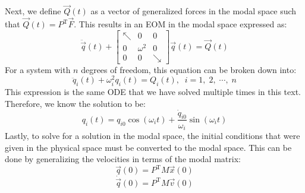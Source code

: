 \documentclass[12pt,letter]{article}
\begin{document}
Next, we define $\vec{Q}(t)$ as a vector of generalized forces in the modal space such that $\vec{Q}(t) = P^{\text{T}}\vec{F}$. This results in an EOM in the modal space expressed as:
\begin{equation}
	\ddot{\vec{q}}(t) +  \begin{bmatrix} \nwarrow & 0 & 0 \\  0  & \omega^2 & 0 \\  0  & 0 & \searrow \end{bmatrix} \vec{q}(t) = \vec{Q}(t)
\end{equation}
For a system with $n$ degrees of freedom, this equation can be broken down into:
\begin{equation}
	\ddot{q}_i(t) + \omega_i^2 q_i (t) =  Q_i(t), \; \; i=1, \; 2, \; \cdots, \;n
\end{equation}
This expression is the same ODE that we have solved multiple times in this text. Therefore, we know the solution to be:
\begin{equation}
	q_i(t) = q_{i0} \cos(\omega_i t) +  \frac{\dot{q}_{i0}}{\omega_i} \sin( \omega_i t)
\end{equation}
Lastly, to solve for a solution in the modal space, the initial conditions that were given in the physical space must be converted to the modal space. This can be done by generalizing the velocities in terms of the modal matrix:
\begin{equation}
	\vec{q}(0) = P^\text{T} M \vec{x}(0)
\end{equation}
\begin{equation}
	\dot{\vec{q}}(0) = P^\text{T} M \vec{v}(0)
\end{equation}


\end{document}
